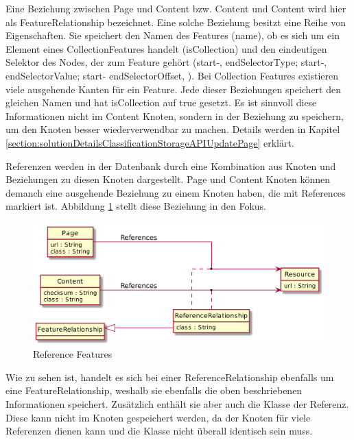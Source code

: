     Eine Beziehung zwischen Page und Content bzw. Content und Content
    wird hier als FeatureRelationship bezeichnet.
    Eine solche Beziehung besitzt eine Reihe von Eigenschaften.
    Sie speichert den Namen des Features (name),
    ob es sich um ein Element eines CollectionFeatures handelt (isCollection)
    und den eindeutigen Selektor des Nodes, der zum Feature gehört
    (start-, endSelectorType; start-, endSelectorValue; start- endSelectorOffset, ).
    Bei Collection Features existieren viele ausgehende Kanten für ein Feature.
    Jede dieser Beziehungen speichert den gleichen Namen und hat isCollection auf true gesetzt.
    Es ist sinnvoll diese Informationen nicht im Content Knoten, sondern in der Beziehung zu speichern,
    um den Knoten besser wiederverwendbar zu machen.
    Details werden in Kapitel \ref{section:solutionDetailsClassificationStorageAPIUpdatePage} erklärt.

    Referenzen werden in der Datenbank durch eine Kombination aus
    {\resource} Knoten und Beziehungen zu diesen Knoten dargestellt.
    Page und Content Knoten können demanch eine ausgehende Beziehung zu einem
    {\resource} Knoten haben, die mit References markiert ist.
    Abbildung \ref{image:dbDataModelResourceRelationship} stellt diese Beziehung in den Fokus.

    \begin{figure}
        \centering
        \includegraphics[scale=\imageScalingFactor]{../resources/db-data-model/resource-relationship.png}
        \caption{Reference Features}
        \label{image:dbDataModelResourceRelationship}
    \end{figure}

    Wie zu sehen ist, handelt es sich bei einer ReferenceRelationship ebenfalls
    um eine FeatureRelationship, weshalb sie ebenfalls die oben beschriebenen Informationen speichert.
    Zusätzlich enthält sie aber auch die Klasse der Referenz.
    Diese kann nicht im {\resource} Knoten gespeichert werden,
    da der Knoten für viele Referenzen dienen kann und die Klasse nicht überall identisch sein muss.